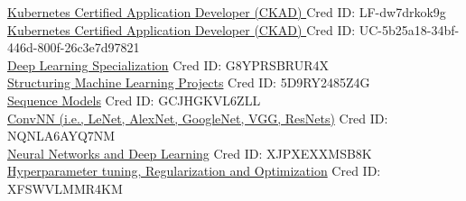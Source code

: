 \documentclass{cv}
\begin{document}
\begin{cv}{}

{\href{https://LF-dw7drkok9g}{Kubernetes Certified Application Developer (CKAD) } \hfill Cred ID: LF-dw7drkok9g \\
}
{\href{https://ude.my/UC-525a18-34b-446d-800-26c3e7d97821}{Kubernetes Certified Application Developer (CKAD) } \hfill Cred ID: UC-5b25a18-34bf-446d-800f-26c3e7d97821 \\
}
{\href{https://www.coursera.org/account/accomplishments/specialization/G8YPRSBRUR4X}{Deep Learning Specialization} \hfill Cred ID: G8YPRSBRUR4X \\
 \href{https://www.coursera.org/account/accomplishments/verify/5D9RY2485Z4G}{Structuring Machine Learning Projects}
 	\hfill Cred ID: 5D9RY2485Z4G \\
 \href{https://www.coursera.org/account/accomplishments/verify/GCJHGKVL6ZLL}{Sequence Models}
 	\hfill Cred ID: GCJHGKVL6ZLL \\
 \href{https://www.coursera.org/account/accomplishments/verify/NQNLA6AYQ7NM}{ConvNN (i.e., LeNet, AlexNet,  GoogleNet, VGG, ResNets)}
 	\hfill Cred ID: NQNLA6AYQ7NM \\ 
 \href{https://www.coursera.org/account/accomplishments/verify/XJPXEXXMSB8K}{Neural Networks and Deep Learning}
 	\hfill Cred ID: XJPXEXXMSB8K \\ 
 \href{https://www.coursera.org/account/accomplishments/verify/XFSWVLMMR4KM}{Hyperparameter tuning, Regularization and Optimization}
 	\hfill Cred ID: XFSWVLMMR4KM \\
}



\desc{}{}{}









\end{cv}
\end{document}
